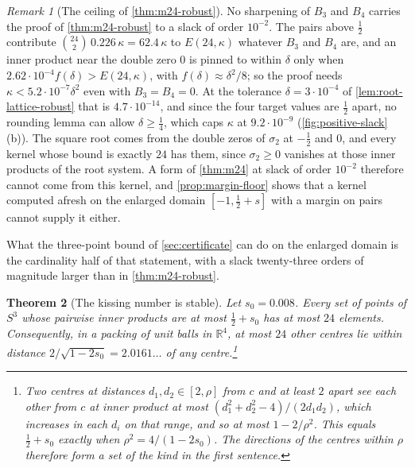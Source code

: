 \documentclass[11pt,reqno]{amsart}
\renewcommand{\_}{\origunderscore\allowbreak}
\numberwithin{equation}{section}
\theoremstyle{plain}
\newtheorem{thm}{Theorem}[section]
\theoremstyle{definition}
\theoremstyle{remark}
\newtheorem{remark}[thm]{Remark}
\begin{document}
\begin{remark}[The ceiling of \cref{thm:m24-robust}]\label{rem:robust-ceiling}
No sharpening of $B_3$ and $B_4$ carries the proof of \cref{thm:m24-robust}
to a slack of order $10^{-2}$. The pairs above $\tfrac12$ contribute
$\binom{24}2\,0.226\,\kappa=62.4\,\kappa$ to $E(24,\kappa)$ whatever $B_3$ and
$B_4$ are, and an inner product near the double zero $0$ is pinned to within
$\delta$ only when $2.62\cdot10^{-4}f(\delta)>E(24,\kappa)$, with
$f(\delta)\approx\delta^2/8$; so the proof needs
$\kappa<5.2\cdot10^{-7}\delta^2$ even with $B_3=B_4=0$. At the tolerance
$\delta=3\cdot10^{-4}$ of \cref{lem:root-lattice-robust} that is
$4.7\cdot10^{-14}$, and since the four target values are $\tfrac12$ apart,
no rounding lemma can allow $\delta\ge\tfrac14$, which caps $\kappa$ at
$9.2\cdot10^{-9}$ (\cref{fig:positive-slack}(b)). The
square root comes from the double zeros of $\sigma_2$ at $-\tfrac12$ and $0$,
and every kernel whose bound is exactly $24$ has them, since $\sigma_2\ge0$
vanishes at those inner products of the root system. A form of
\cref{thm:m24} at slack of order $10^{-2}$ therefore cannot come from this
kernel, and \cref{prop:margin-floor} shows that a kernel computed afresh on
the enlarged domain $[-1,\tfrac12+s]$ with a margin on pairs cannot supply
it either.
\end{remark}

What the three-point bound of \cref{sec:certificate} can do on the enlarged
domain is the cardinality half of that statement, with a slack twenty-three
orders of magnitude larger than in \cref{thm:m24-robust}.

\begin{thm}[The kissing number is stable]\label{thm:kissing-stable}
Let $s_0=0.008$. Every set of points of $S^3$ whose pairwise inner
products are at most $\tfrac12+s_0$ has at most $24$ elements.
Consequently, in a packing of unit balls in $\mathbb{R}^4$, at most $24$ other
centres lie within distance $2/\sqrt{1-2s_0}=2.0161\ldots$ of any
centre.\footnote{Two centres at distances $d_1,d_2\in[2,\rho]$ from $c$ and
  at least $2$ apart see each other from $c$ at inner product at most
  $(d_1^2+d_2^2-4)/(2d_1d_2)$, which increases in each $d_i$ on that range, and
  so at most $1-2/\rho^2$. This equals $\frac12+s_0$ exactly when
  $\rho^2=4/(1-2s_0)$. The directions of the centres within $\rho$ therefore
  form a set of the kind in the first sentence.}
\end{thm}
\end{document}
